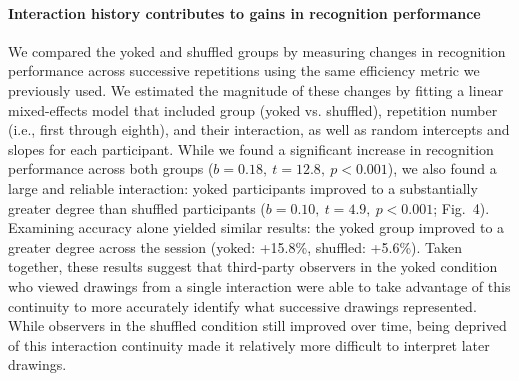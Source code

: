 \documentclass[11pt,letterpaper]{article}
\begin{document}
\paragraph{Interaction history contributes to gains in recognition performance}
We compared the yoked and shuffled groups by measuring changes in recognition performance across successive repetitions using the same efficiency metric we previously used.
We estimated the magnitude of these changes by fitting a linear mixed-effects model that included group (yoked vs. shuffled), repetition number (i.e., first through eighth), and their interaction, as well as random intercepts and slopes for each participant.
While we found a significant increase in recognition performance across both groups ($b = 0.18, ~t = 12.8, ~p < 0.001$), %
we also found a large and reliable interaction:
yoked participants improved to a substantially greater degree than shuffled participants ($b = 0.10, ~t = 4.9, ~p<0.001$; Fig.~4).
Examining accuracy alone yielded similar results: the yoked group improved to a greater degree across the session (yoked: +15.8\%, shuffled: +5.6\%).
Taken together, these results suggest that third-party observers in the yoked condition who viewed drawings from a single interaction were able to take advantage of this continuity to more accurately identify what successive drawings represented.
While observers in the shuffled condition still improved over time, being deprived of this interaction continuity made it relatively more difficult to interpret later drawings.
\end{document}
